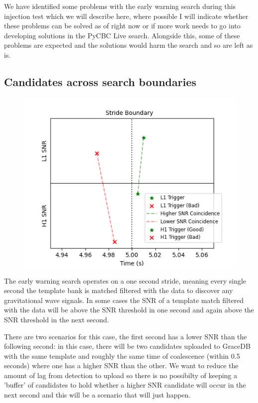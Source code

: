 We have identified some problems with the early warning search during this injection test which we will describe here, where possible I will indicate whether these problems can be solved as of right now or if more work needs to go into developing solutions in the PyCBC Live search. Alongside this, some of these problems are expected and the solutions would harm the search and so are left as is.

\subsection{Candidates across search boundaries}
%
\begin{figure}
       \centering
    \includegraphics[width=\textwidth]{images/ew/cands_across_bounds.png}
    \caption{}
    \label{fig:ew_boundary_candidates_trig_plot}
\end{figure}
%
The early warning search operates on a one second stride, meaning every single second the template bank is matched filtered with the data to discover any gravitational wave signals. In some cases the SNR of a template match filtered with the data will be above the SNR threshold in one second and again above the SNR threshold in the next second.

There are two scenarios for this case, the first second has a lower SNR than the following second: in this case, there will be two candidates uploaded to GraceDB with the same template and roughly the same time of coalescence (within 0.5 seconds) where one has a higher SNR than the other. We want to reduce the amount of lag from detection to upload so there is no possibilty of keeping a 'buffer' of candidates to hold whether a higher SNR candidate will occur in the next second and this will be a scenario that will just happen.

